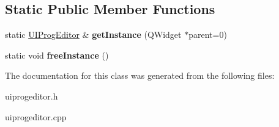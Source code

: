 \subsection*{Static Public Member Functions}
\begin{DoxyCompactItemize}
\item 
static \hyperlink{class_u_i_prog_editor}{U\+I\+Prog\+Editor} \& {\bfseries get\+Instance} (Q\+Widget $\ast$parent=0)\hypertarget{class_u_i_prog_editor_a393b597e560a143cf1797c3958765b10}{}\label{class_u_i_prog_editor_a393b597e560a143cf1797c3958765b10}

\item 
static void {\bfseries free\+Instance} ()\hypertarget{class_u_i_prog_editor_ae96cd737883d2723b9532990ebdfa573}{}\label{class_u_i_prog_editor_ae96cd737883d2723b9532990ebdfa573}

\end{DoxyCompactItemize}


The documentation for this class was generated from the following files\+:\begin{DoxyCompactItemize}
\item 
uiprogeditor.\+h\item 
uiprogeditor.\+cpp\end{DoxyCompactItemize}
